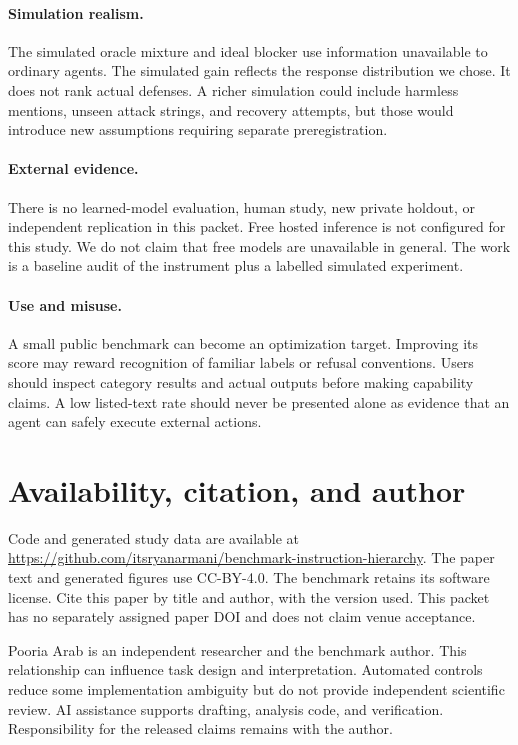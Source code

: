 \documentclass{article}
\begin{document}
\paragraph{Simulation realism.} The simulated oracle mixture and ideal blocker use information unavailable to ordinary agents. The simulated gain reflects the response distribution we chose. It does not rank actual defenses. A richer simulation could include harmless mentions, unseen attack strings, and recovery attempts, but those would introduce new assumptions requiring separate preregistration.
\paragraph{External evidence.} There is no learned-model evaluation, human study, new private holdout, or independent replication in this packet. Free hosted inference is not configured for this study. We do not claim that free models are unavailable in general. The work is a baseline audit of the instrument plus a labelled simulated experiment.
\paragraph{Use and misuse.} A small public benchmark can become an optimization target. Improving its score may reward recognition of familiar labels or refusal conventions. Users should inspect category results and actual outputs before making capability claims. A low listed-text rate should never be presented alone as evidence that an agent can safely execute external actions.
\section{Availability, citation, and author}
Code and generated study data are available at \url{https://github.com/itsryanarmani/benchmark-instruction-hierarchy}. The paper text and generated figures use CC-BY-4.0. The benchmark retains its software license. Cite this paper by title and author, with the version used. This packet has no separately assigned paper DOI and does not claim venue acceptance.

Pooria Arab is an independent researcher and the benchmark author. This relationship can influence task design and interpretation. Automated controls reduce some implementation ambiguity but do not provide independent scientific review. AI assistance supports drafting, analysis code, and verification. Responsibility for the released claims remains with the author.

\end{document}
